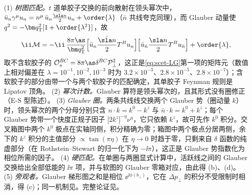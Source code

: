 \begin{proofsketch}
(1) \emph{树图匹配。}$t$ 道单胶子交换的前向散射在领头幂次中，$\bar u_n\gamma^\mu u_n=n^\mu\,\bar u_n\frac{\bar{\sla n}}{2}u_n+\order{\lambda}$（$\bar n$ 共线夸克同理），而 Glauber 动量使 $q^2=-\bm q_{\mathrm T}^2[1+\order{\lambda^2}]$，故
\[
\ii\mathcal M=-\ii\,\frac{8\pi\as}{\bm q_{\mathrm T}^2}\Big[\bar u_n\frac{\bar{\sla n}}{2}T^Bu_n\Big]\Big[\bar u_{\bar n}\frac{\sla n}{2}T^Bu_{\bar n}\Big]+\order{\lambda},
\]
取不含软胶子的 $\mathcal O_s^{BC}=8\pi\as\delta^{BC}\mathcal P_\perp^2$，这正是\cref{eq:scet-LG}第一项的矩阵元（数值上相对偏差在 $\lambda=10^{-1},10^{-2},10^{-3}$ 时为 $3.2\times10^{-3}$、$2.8\times10^{-5}$、$2.8\times10^{-7}$）；含软胶子的部分由带一个与两个软胶子的匹配确定，其单胶子 Feynman 规则是 Lipatov 顶角\cite[第~5.1、6~节]{RothsteinStewart2016}。%
(2) \emph{幂次计数。}Glauber 算符是领头幂次的，且其形式没有圈修正\cite[第~5.3~节]{RothsteinStewart2016}（E-S 型陈述）。
(3) \emph{Glauber 圈。}两条共线线交换两个 Glauber 势（圈动量 $k$）时，领头幂次的两个分母分别只含 $n\cdot k=k^0-k^z$ 与 $\bar n\cdot k=k^0+k^z$；每个 Glauber 势带一个快度正规子因子 $|2k^z|^{-\eta}\nu^\eta$，它只依赖 $k^z$，故可先作 $k^0$ 积分。交叉箱图中两个 $k^0$ 极点在实轴同侧，积分精确为零；箱图中两个极点分居两侧，余下的 $k^z$ 积分的主值部分 $\propto\tan(\pi\eta)$ 在 $\eta\to0$ 时趋于零，只剩来自 $\delta$ 函数的纯虚部分（在 Rothstein--Stewart 的归一化下为 $-\ii\pi$），这正是 Glauber 势指数化为相位所需的因子\cite[第~5.2.1~节，式~(5.30)、(5.31)]{RothsteinStewart2016}。%
(4) \emph{硬匹配。}在单圈与两圈显式计算中，活跃线之间的 Glauber 交换给出全部低能的 $\ii\pi$ 项，并与软图的 Glauber 零箱对应，由此得 (b)、(d)\cite[第~10~节]{RothsteinStewart2016}。
(5) \emph{旁观者。}Glauber 梯形图之和是相位 $\ee^{\ii\phi(b_\perp)}$，它在 $\Delta p_\perp$ 的积分不受限制时相消，得 (c)\cite[式~(9.1)、(9.18)--(9.19)、(11.12)--(11.13)]{RothsteinStewart2016}；同一机制见\cite[式~(14)]{AybatSterman2009}。完整论证见\cite[第~5、9--11~节]{RothsteinStewart2016}。
\end{proofsketch}

